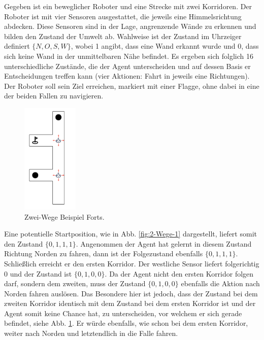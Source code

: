 Gegeben ist ein beweglicher Roboter und eine Strecke mit zwei Korridoren. Der Roboter ist mit vier Sensoren ausgestattet, die jeweils eine Himmelsrichtung abdecken. Diese Sensoren sind in der Lage, angrenzende Wände zu erkennen und bilden den Zustand der Umwelt ab. Wahlweise ist der Zustand im Uhrzeiger definiert $\{N, O, S, W\}$, wobei 1 angibt, dass eine Wand erkannt wurde und 0, dass sich keine Wand in der unmittelbaren Nähe befindet. Es ergeben sich folglich 16 unterschiedliche Zustände, die der Agent unterscheiden und auf dessen Basis er Entscheidungen treffen kann (vier Aktionen: Fahrt in jeweils eine Richtungen). Der Roboter soll sein Ziel erreichen, markiert mit einer Flagge, ohne dabei in eine der beiden Fallen zu navigieren.
\par
\begin{figure}
  \begin{center}
  \includegraphics[height=200px]{images/2passagesStart.png}  \end{center}
  \caption{Zwei-Wege Beispiel Forts.}
  \label{fig:2-Wege-2}
\end{figure}

Eine potentielle Startposition, wie in Abb. \ref{fig:2-Wege-1} dargestellt, liefert somit den Zustand $\{0, 1, 1, 1\}$. Angenommen der Agent hat gelernt in diesem Zustand Richtung Norden zu fahren, dann ist der Folgezustand ebenfalls $\{0, 1, 1, 1\}$. Schließlich erreicht er den ersten Korridor. Der westliche Sensor liefert folgerichtig 0 und der Zustand ist $\{0, 1, 0, 0\}$. Da der Agent nicht den ersten Korridor folgen darf, sondern dem zweiten, muss der Zustand $\{0, 1, 0, 0\}$ ebenfalls die Aktion \glqq nach Norden fahren\grqq{} auslösen. Das Besondere hier ist jedoch, dass der Zustand bei dem zweiten Korridor identisch mit dem Zustand bei dem ersten Korridor ist und der Agent somit keine Chance hat, zu unterscheiden, vor welchem er sich gerade befindet, siehe Abb. \ref{fig:2-Wege-2}. Er würde ebenfalls, wie schon bei dem ersten Korridor, weiter nach Norden und letztendlich in die Falle fahren.
\par 

